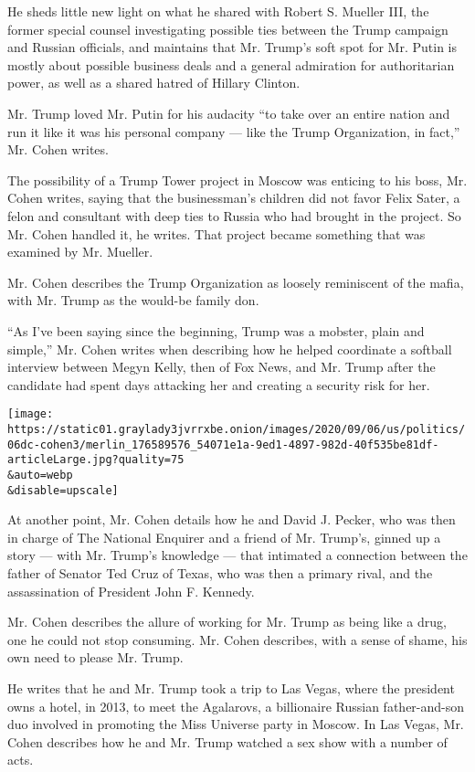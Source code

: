 He sheds little new light on what he shared with Robert S. Mueller III,
the former special counsel investigating possible ties between the Trump
campaign and Russian officials, and maintains that Mr. Trump's soft spot
for Mr. Putin is mostly about possible business deals and a general
admiration for authoritarian power, as well as a shared hatred of
Hillary Clinton.

Mr. Trump loved Mr. Putin for his audacity ``to take over an entire
nation and run it like it was his personal company --- like the Trump
Organization, in fact,'' Mr. Cohen writes.

The possibility of a Trump Tower project in Moscow was enticing to his
boss, Mr. Cohen writes, saying that the businessman's children did not
favor Felix Sater, a felon and consultant with deep ties to Russia who
had brought in the project. So Mr. Cohen handled it, he writes. That
project became something that was examined by Mr. Mueller.

Mr. Cohen describes the Trump Organization as loosely reminiscent of the
mafia, with Mr. Trump as the would-be family don.

``As I've been saying since the beginning, Trump was a mobster, plain
and simple,'' Mr. Cohen writes when describing how he helped coordinate
a softball interview between Megyn Kelly, then of Fox News, and Mr.
Trump after the candidate had spent days attacking her and creating a
security risk for her.

\texttt{[image: https://static01.graylady3jvrrxbe.onion/images/2020/09/06/us/politics/06dc-cohen3/merlin\_176589576\_54071e1a-9ed1-4897-982d-40f535be81df-articleLarge.jpg?quality=75\\\&auto=webp\\\&disable=upscale]}

At another point, Mr. Cohen details how he and David J. Pecker, who was
then in charge of The National Enquirer and a friend of Mr. Trump's,
ginned up a story --- with Mr. Trump's knowledge --- that intimated a
connection between the father of Senator Ted Cruz of Texas, who was then
a primary rival, and the assassination of President John F. Kennedy.

Mr. Cohen describes the allure of working for Mr. Trump as being like a
drug, one he could not stop consuming. Mr. Cohen describes, with a sense
of shame, his own need to please Mr. Trump.

He writes that he and Mr. Trump took a trip to Las Vegas, where the
president owns a hotel, in 2013, to meet the Agalarovs, a billionaire
Russian father-and-son duo involved in promoting the Miss Universe party
in Moscow. In Las Vegas, Mr. Cohen describes how he and Mr. Trump
watched a sex show with a number of acts.

